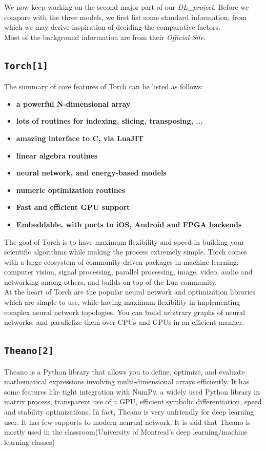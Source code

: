 \documentclass[12pt]{article}
\begin{document}
We now keep working on the second major part of our {\it DL\_project}. Before we compare with the three models, we first list some standard information, from which we may derive inspiration of deciding the comparative factors.\\
Most of the background information are from their {\it Official Site}.

\subsection{\texttt{Torch[1]}}
The summary of core features of Torch can be listed as follows:
\begin{itemize}
	\item {\bf a powerful N-dimensional array}
	\item {\bf lots of routines for indexing, slicing, transposing, ...}
	\item {\bf amazing interface to C, via LuaJIT}
	\item {\bf linear algebra routines}
	\item {\bf neural network, and energy-based models}
	\item {\bf numeric optimization routines}
	\item {\bf Fast and efficient GPU support}
	\item {\bf Embeddable, with ports to iOS, Android and FPGA backends}
\end{itemize}
The goal of Torch is to have maximum flexibility and speed in building your scientific algorithms while making the process extremely simple. Torch comes with a large ecosystem of community-driven packages in machine learning, computer vision, signal processing, parallel processing, image, video, audio and networking among others, and builds on top of the Lua community.\\
At the heart of Torch are the popular neural network and optimization libraries which are simple to use, while having maximum flexibility in implementing complex neural network topologies. You can build arbitrary graphs of neural networks, and parallelize them over CPUs and GPUs in an efficient manner.
\subsection{\texttt{Theano[2]}}
Theano is a Python library that allows you to define, optimize, and evaluate mathematical expressions involving multi-dimensional arrays efficiently. It has some features like tight integration with NumPy, a widely used Python library in matrix process, transparent use of a GPU, efficient symbolic differentiation, speed and stability optimizations. In fact, Theano is very unfriendly for deep learning user. It has few supports to modern nenrual network. It is said that Theano is mostly used in the classroom(University of Montreal’s deep learning/machine learning classes)
\end{document}
